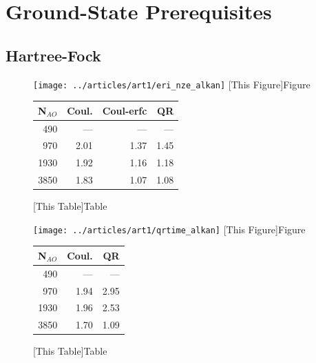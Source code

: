 \section{Ground-State Prerequisites}

\subsection{Hartree-Fock}

\begin{figure}
\begin{minipage}{0.5\textwidth}
\texttt{[image: ../articles/art1/eri\_nze\_alkan]}
[This Figure]{Figure}
\end{minipage}
\hspace{0.05\textwidth}
\begin{minipage}{0.3\textwidth}
\begin{tabular}{rrrr}
\hline
N$_{AO}$ & Coul. & Coul-erfc & QR \\ \hline
490 & --- & --- & --- \\ 
970 & 2.01 & 1.37 & 1.45 \\ 
1930 & 1.92 & 1.16 & 1.18 \\ 
3850 & 1.83 & 1.07 & 1.08 \\ \hline
\end{tabular}
[This Table]{Table}
\end{minipage}
\end{figure}
%
\begin{figure}
\begin{minipage}{0.5\textwidth}
\texttt{[image: ../articles/art1/qrtime\_alkan]}
[This Figure]{Figure}
\end{minipage}
\hspace{0.05\textwidth}
\begin{minipage}{0.3\textwidth}
\begin{tabular}{rrr}
\hline
N$_{AO}$ & Coul. & QR \\ \hline
490 & --- & --- \\ 
970 & 1.94 & 2.95 \\ 
1930 & 1.96 & 2.53 \\ 
3850 & 1.70 & 1.09 \\ \hline
\end{tabular}
[This Table]{Table}
\end{minipage}
\end{figure}
%
